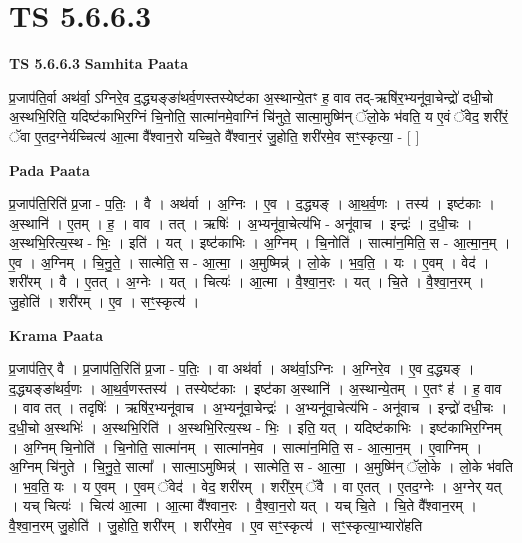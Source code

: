 \documentclass[17pt]{extarticle}
\begin{document}
\section{ TS 5.6.6.3 }

\textbf{TS 5.6.6.3 } \newline
\textbf{Samhita Paata} \newline

प्र॒जाप॑ति॒र्वा अथ॑र्वा॒ ऽग्निरे॒व द॒द्ध्यङ्ङा॑थर्व॒णस्तस्येष्ट॑का अ॒स्थान्ये॒तꣳ ह॒ वाव तद्-ऋषि॑र॒भ्यनू॑वा॒चेन्द्रो॑ दधी॒चो अ॒स्थभि॒रिति॒ यदिष्ट॑काभिर॒ग्निं चि॒नोति॒ सात्मा॑नमे॒वाग्निं चि॑नुते॒ सात्मा॒मुष्मि॑न् ॅलो॒के भ॑वति॒ य ए॒वं ॅवेद॒ शरी॑रं॒ ॅवा ए॒तद॒ग्नेर्यच्चित्य॑ आ॒त्मा वै᳚श्वान॒रो यच्चि॒ते वै᳚श्वान॒रं जु॒होति॒ शरी॑रमे॒व सꣳ॒॒स्कृत्या॒ - [  ] \newline

\textbf{Pada Paata} \newline

प्र॒जाप॑ति॒रिति॑ प्र॒जा - प॒तिः॒ । वै । अथ॑र्वा । अ॒ग्निः । ए॒व । द॒द्ध्यङ् । आ॒थ॒र्व॒णः । तस्य॑ । इष्ट॑काः । अ॒स्थानि॑ । ए॒तम् । ह॒ । वाव । तत् । ऋषिः॑ । अ॒भ्यनू॑वा॒चेत्य॑भि - अनू॑वाच । इन्द्रः॑ । द॒धी॒चः । अ॒स्थभि॒रित्य॒स्थ - भिः॒ । इति॑ । यत् । इष्ट॑काभिः । अ॒ग्निम् । चि॒नोति॑ । सात्मा॑न॒मिति॒ स - आ॒त्मा॒न॒म् । ए॒व । अ॒ग्निम् । चि॒नु॒ते॒ । सात्मेति॒ स - आ॒त्मा॒ । अ॒मुष्मिन्न्॑ । लो॒के । भ॒व॒ति॒ । यः । ए॒वम् । वेद॑ । शरी॑रम् । वै । ए॒तत् । अ॒ग्नेः । यत् । चित्यः॑ । आ॒त्मा । वै॒श्वा॒न॒रः । यत् । चि॒ते । वै॒श्वा॒न॒रम् । जु॒होति॑ । शरी॑रम् । ए॒व । सꣳ॒॒स्कृत्य॑ ।  \newline


\textbf{Krama Paata} \newline

प्र॒जाप॑ति॒र् वै । प्र॒जाप॑ति॒रिति॑ प्र॒जा - प॒तिः॒ । वा अथ॑र्वा । अथ॑र्वा॒ऽग्निः । अ॒ग्निरे॒व । ए॒व द॒द्ध्यङ् । द॒द्ध्यङ्ङा॑थर्व॒णः । आ॒थ॒र्व॒णस्तस्य॑ । तस्येष्ट॑काः । इष्ट॑का अ॒स्थानि॑ । अ॒स्थान्ये॒तम् । ए॒तꣳ ह॑ । ह॒ वाव । वाव तत् । तदृषिः॑ । ऋषि॑र॒भ्यनू॑वाच । अ॒भ्यनू॑वा॒चेन्द्रः॑ । अ॒भ्यनू॑वा॒चेत्य॑भि - अनू॑वाच । इन्द्रो॑ दधी॒चः । द॒धी॒चो अ॒स्थभिः॑ । अ॒स्थभि॒रिति॑ । अ॒स्थभि॒रित्य॒स्थ - भिः॒ । इति॒ यत् । यदिष्ट॑काभिः । इष्ट॑काभिर॒ग्निम् । अ॒ग्निम् चि॒नोति॑ । चि॒नोति॒ सात्मा॑नम् । सात्मा॑नमे॒व । सात्मा॑न॒मिति॒ स - आ॒त्मा॒न॒म् । ए॒वाग्निम् । अ॒ग्निम् चि॑नुते । चि॒नु॒ते॒ सात्मा᳚ । सात्मा॒ऽमुष्मिन्न्॑ । सात्मेति॒ स - आ॒त्मा॒ । अ॒मुष्मि॑न् ॅलो॒के । लो॒के भ॑वति । भ॒व॒ति॒ यः । य ए॒वम् । ए॒वम् ॅवेद॑ । वेद॒ शरी॑रम् । शरी॑र॒म् ॅवै । वा ए॒तत् । ए॒तद॒ग्नेः । अ॒ग्नेर् यत् । यच् चित्यः॑ । चित्य॑ आ॒त्मा । आ॒त्मा वै᳚श्वान॒रः । वै॒श्वा॒न॒रो यत् । यच् चि॒ते । चि॒ते वै᳚श्वान॒रम् । वै॒श्वा॒न॒रम् जु॒होति॑ । जु॒होति॒ शरी॑रम् । शरी॑रमे॒व । ए॒व सꣳ॒॒स्कृत्य॑ । सꣳ॒॒स्कृत्या॒भ्यारो॑हति \newline
\end{document}
